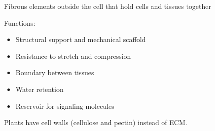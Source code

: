 Fibrous elements outside the cell that hold cells and tissues together

Functions:
\begin{itemize}
    \item Structural support and mechanical scaffold
    \item Resistance to stretch and compression
    \item Boundary between tissues
    \item Water retention
    \item Reservoir for signaling molecules
\end{itemize}
Plants have cell walls (cellulose and pectin) instead of ECM.